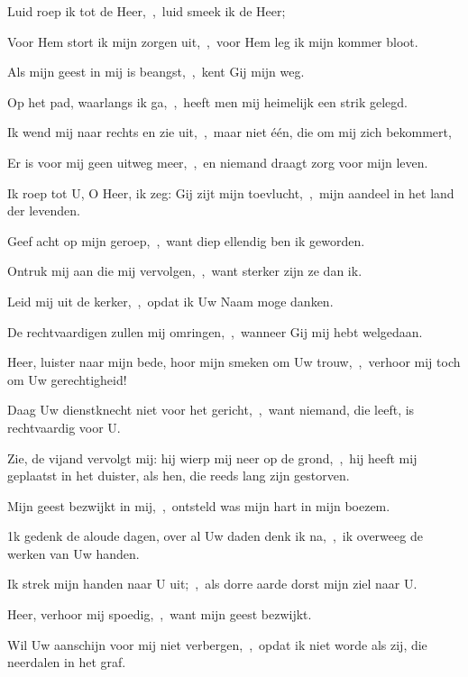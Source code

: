\documentclass[12pt,twoside,a5paper]{article}
\begin{document}
\begin{halfparskip}

   Luid roep ik tot de Heer,~\sep\ luid smeek ik de Heer;


  Voor Hem stort ik mijn zorgen uit,~\sep\ voor Hem leg ik mijn kommer bloot.

  Als mijn geest in mij is beangst,~\sep\ kent Gij mijn weg.

  Op het pad, waarlangs ik ga,~\sep\ heeft men mij heimelijk een strik gelegd.

  Ik wend mij naar rechts en zie uit,~\sep\ maar niet één, die om mij zich bekommert,

  Er is voor mij geen uitweg meer,~\sep\ en niemand draagt zorg voor mijn leven.

  Ik roep tot U, O Heer, ik zeg: Gij zijt mijn toevlucht,~\sep\ mijn aandeel in het land der levenden.

  Geef acht op mijn geroep,~\sep\ want diep ellendig ben ik geworden.

  Ontruk mij aan die mij vervolgen,~\sep\ want sterker zijn ze dan ik.

  Leid mij uit de kerker,~\sep\ opdat ik Uw Naam moge danken.

  De rechtvaardigen zullen mij omringen,~\sep\ wanneer Gij mij hebt welgedaan.

   Heer, luister naar mijn bede, hoor mijn smeken om Uw trouw,~\sep\ verhoor mij toch om Uw gerechtigheid!

  Daag Uw dienstknecht niet voor het gericht,~\sep\ want niemand, die leeft, is rechtvaardig voor U.

  Zie, de vijand vervolgt mij: hij wierp mij neer op de grond,~\sep\ hij heeft mij geplaatst in het duister, als hen, die reeds lang zijn gestorven.

  Mijn geest bezwijkt in mij,~\sep\ ontsteld was mijn hart in mijn boezem.

  1k gedenk de aloude dagen, over al Uw daden denk ik na,~\sep\ ik overweeg de werken van Uw handen.

  Ik strek mijn handen naar U uit;~\sep\ als dorre aarde dorst mijn ziel naar U.

  Heer, verhoor mij spoedig,~\sep\ want mijn geest bezwijkt.

  Wil Uw aanschijn voor mij niet verbergen,~\sep\ opdat ik niet worde als zij, die neerdalen in het graf.


\end{halfparskip}
\end{document}
